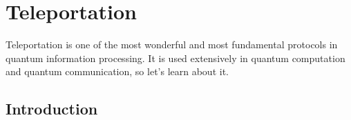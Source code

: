 \chapter{Teleportation}
\label{sec:8_teleportation}


Teleportation is one of the most wonderful and most fundamental protocols in quantum information processing. It is used extensively in quantum computation and quantum communication, so let's learn about it.

\section{Introduction}
\label{sec:8-1_introduction}


